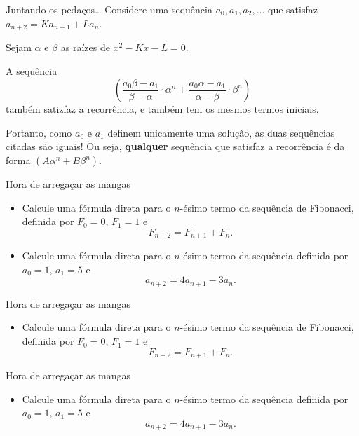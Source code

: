 \documentclass[aspectratio=169, handout]{beamer}
\begin{document}
\begin{frame}{Juntando os pedaços\dots}
	Considere uma sequência $a_0, a_1, a_2, \dots$ que satisfaz $a_{n+2} = K a_{n+1} + L a_n$.

	\pause Sejam $\alpha$ e  $\beta$ as raízes de $x^2 - Kx - L = 0$.

	A sequência \[
		\left( \frac{a_0\beta - a_1}{\beta - \alpha} \cdot \alpha^n + \frac{a_0\alpha - a_1}{\alpha - \beta} \cdot \beta^n \right) 
	\]
	também satizfaz a recorrência, e também tem os mesmos termos iniciais.

	\vspace{.5em}
	\pause Portanto, como $a_0$ e $a_1$ definem unicamente uma solução, as duas sequências citadas são iguais!
	\pause Ou seja, \textbf{qualquer} sequência que satisfaz a recorrência é da forma $(A\alpha^n + B\beta^n)$. 

	\vspace{.5em}
\end{frame}
%
\begin{frame}{Hora de arregaçar as mangas}
	\begin{itemize}
		\item Calcule uma fórmula direta para o $n$-ésimo termo da sequência de Fibonacci, definida por $F_0 = 0$, $F_1 = 1$ e  \[
				F_{n+2} = F_{n+1} + F_n.
			\]
			
		\item Calcule uma fórmula direta para o $n$-ésimo termo da sequência definida por $a_0 = 1$, $a_1 = 5$ e  \[
				a_{n+2} = 4a_{n+1} - 3a_n.
			\]
	\end{itemize}
\end{frame}

\begin{frame}[t]{Hora de arregaçar as mangas}
	\begin{itemize}
		\item Calcule uma fórmula direta para o $n$-ésimo termo da sequência de Fibonacci, definida por $F_0 = 0$, $F_1 = 1$ e  \[
				F_{n+2} = F_{n+1} + F_n.
			\]
	\end{itemize}
	
\end{frame}

\begin{frame}[t]{Hora de arregaçar as mangas}
	\begin{itemize}
		\item Calcule uma fórmula direta para o $n$-ésimo termo da sequência definida por $a_0 = 1$, $a_1 = 5$ e  \[
				a_{n+2} = 4a_{n+1} - 3a_n.
			\]
	\end{itemize}
	
\end{frame}
\end{document}
